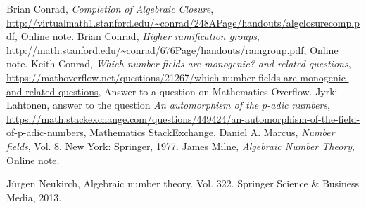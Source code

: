 \documentclass{article}
\begin{document}
\begin{thebibliography}{9}

 Brian Conrad, \emph{Completion of Algebraic Closure}, \url{http://virtualmath1.stanford.edu/~conrad/248APage/handouts/algclosurecomp.pdf}, Online note. 
 Brian Conrad, \emph{Higher ramification groups}, \url{http://math.stanford.edu/~conrad/676Page/handouts/ramgroup.pdf}, Online note. 
 Keith Conrad, \emph{Which number fields are monogenic? and related questions}, \url{https://mathoverflow.net/questions/21267/which-number-fields-are-monogenic-and-related-questions}, Answer to a question on Mathematics Overflow.
Jyrki Lahtonen, answer to the question \emph{An automorphism of the $p$-adic numbers}, \url{https://math.stackexchange.com/questions/449424/an-automorphism-of-the-field-of-p-adic-numbers}, Mathematics StackExchange.
Daniel A. Marcus, \emph{Number fields}, Vol. 8. New York: Springer, 1977.
James Milne, \emph{Algebraic Number Theory}, Online note.

J\"urgen Neukirch, Algebraic number theory. Vol. 322. Springer Science \& Business Media, 2013.

\end{thebibliography}
\end{document}
